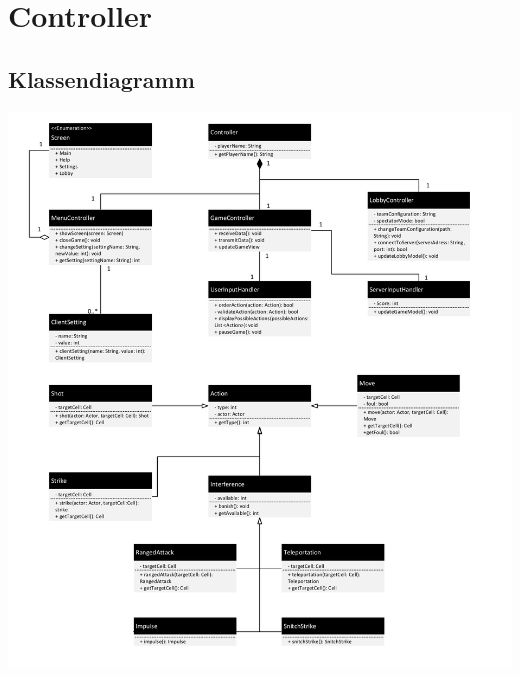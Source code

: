 \section{Controller}
\subsection{Klassendiagramm}
\begin{center}
	\includegraphics[width=18cm]{images/Klassendiagram_Controller}
\end{center}
